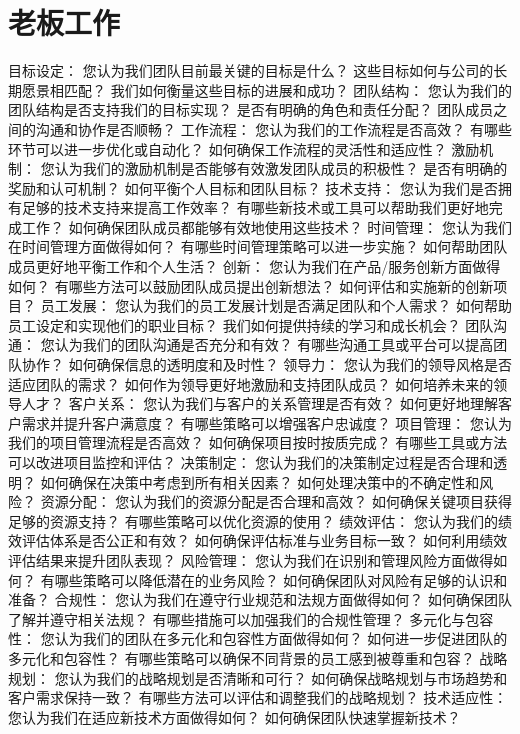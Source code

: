 \documentclass[12pt]{book}
\begin{document}
\section{老板工作}
目标设定：
您认为我们团队目前最关键的目标是什么？
这些目标如何与公司的长期愿景相匹配？
我们如何衡量这些目标的进展和成功？
团队结构：
您认为我们的团队结构是否支持我们的目标实现？
是否有明确的角色和责任分配？
团队成员之间的沟通和协作是否顺畅？
工作流程：
您认为我们的工作流程是否高效？
有哪些环节可以进一步优化或自动化？
如何确保工作流程的灵活性和适应性？
激励机制：
您认为我们的激励机制是否能够有效激发团队成员的积极性？
是否有明确的奖励和认可机制？
如何平衡个人目标和团队目标？
技术支持：
您认为我们是否拥有足够的技术支持来提高工作效率？
有哪些新技术或工具可以帮助我们更好地完成工作？
如何确保团队成员都能够有效地使用这些技术？
时间管理：
您认为我们在时间管理方面做得如何？
有哪些时间管理策略可以进一步实施？
如何帮助团队成员更好地平衡工作和个人生活？
创新：
您认为我们在产品/服务创新方面做得如何？
有哪些方法可以鼓励团队成员提出创新想法？
如何评估和实施新的创新项目？
员工发展：
您认为我们的员工发展计划是否满足团队和个人需求？
如何帮助员工设定和实现他们的职业目标？
我们如何提供持续的学习和成长机会？
团队沟通：
您认为我们的团队沟通是否充分和有效？
有哪些沟通工具或平台可以提高团队协作？
如何确保信息的透明度和及时性？
领导力：
您认为我们的领导风格是否适应团队的需求？
如何作为领导更好地激励和支持团队成员？
如何培养未来的领导人才？
客户关系：
您认为我们与客户的关系管理是否有效？
如何更好地理解客户需求并提升客户满意度？
有哪些策略可以增强客户忠诚度？
项目管理：
您认为我们的项目管理流程是否高效？
如何确保项目按时按质完成？
有哪些工具或方法可以改进项目监控和评估？
决策制定：
您认为我们的决策制定过程是否合理和透明？
如何确保在决策中考虑到所有相关因素？
如何处理决策中的不确定性和风险？
资源分配：
您认为我们的资源分配是否合理和高效？
如何确保关键项目获得足够的资源支持？
有哪些策略可以优化资源的使用？
绩效评估：
您认为我们的绩效评估体系是否公正和有效？
如何确保评估标准与业务目标一致？
如何利用绩效评估结果来提升团队表现？
风险管理：
您认为我们在识别和管理风险方面做得如何？
有哪些策略可以降低潜在的业务风险？
如何确保团队对风险有足够的认识和准备？
合规性：
您认为我们在遵守行业规范和法规方面做得如何？
如何确保团队了解并遵守相关法规？
有哪些措施可以加强我们的合规性管理？
多元化与包容性：
您认为我们的团队在多元化和包容性方面做得如何？
如何进一步促进团队的多元化和包容性？
有哪些策略可以确保不同背景的员工感到被尊重和包容？
战略规划：
您认为我们的战略规划是否清晰和可行？
如何确保战略规划与市场趋势和客户需求保持一致？
有哪些方法可以评估和调整我们的战略规划？
技术适应性：
您认为我们在适应新技术方面做得如何？
如何确保团队快速掌握新技术？
\end{document}

